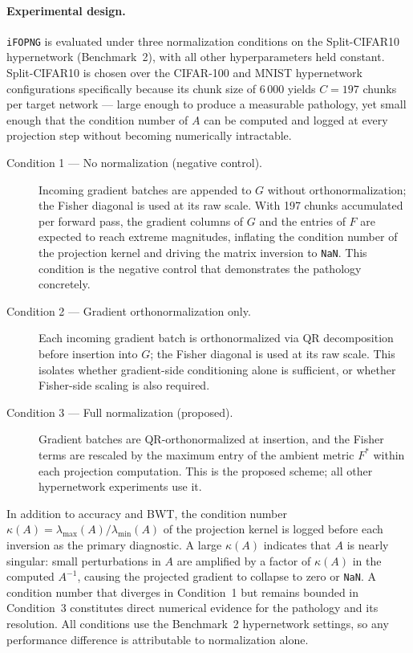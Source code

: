 \paragraph{Experimental design.}
\texttt{iFOPNG} is evaluated under three normalization conditions on the
Split-CIFAR10 hypernetwork (Benchmark~2), with all other hyperparameters
held constant.
Split-CIFAR10 is chosen over the CIFAR-100 and MNIST hypernetwork
configurations specifically because its chunk size of 6\,000 yields
$C = 197$ chunks per target network --- large enough to produce a
measurable pathology, yet small enough that the condition number of $A$
can be computed and logged at every projection step without becoming
numerically intractable.

\begin{description}
    \item[Condition 1 --- No normalization (negative control).]
    Incoming gradient batches are appended to $G$ without orthonormalization;
    the Fisher diagonal is used at its raw scale.
    With 197 chunks accumulated per forward pass, the gradient columns of  
    $G$ and the entries of $F$ are expected to reach extreme
    magnitudes, inflating the condition number of the projection kernel and
    driving the matrix inversion to \texttt{NaN}.
    This condition is the negative control that demonstrates the pathology
    concretely.

    \item[Condition 2 --- Gradient orthonormalization only.]
    Each incoming gradient batch is orthonormalized via QR decomposition
    before insertion into $G$; the Fisher diagonal is used at its raw scale.
    This isolates whether gradient-side conditioning alone is sufficient,
    or whether Fisher-side scaling is also required.

    \item[Condition 3 --- Full normalization (proposed).]
    Gradient batches are QR-orthonormalized at insertion, and the Fisher
    terms are rescaled by the maximum entry of the ambient metric $F^*$
    within each projection computation.
    This is the proposed scheme; all other hypernetwork experiments use it.
\end{description}

In addition to accuracy and BWT, the condition number
$\kappa(A) = \lambda_{\max}(A) / \lambda_{\min}(A)$ of the projection
kernel is logged before each inversion as the primary diagnostic.
A large $\kappa(A)$ indicates that $A$ is nearly singular: small
perturbations in $A$ are amplified by a factor of $\kappa(A)$ in the
computed $A^{-1}$, causing the projected gradient to collapse to zero
or \texttt{NaN}.
A condition number that diverges in Condition~1 but remains bounded in
Condition~3 constitutes direct numerical evidence for the pathology and
its resolution.
All conditions use the Benchmark~2 hypernetwork settings, so any performance difference is attributable
to normalization alone.

